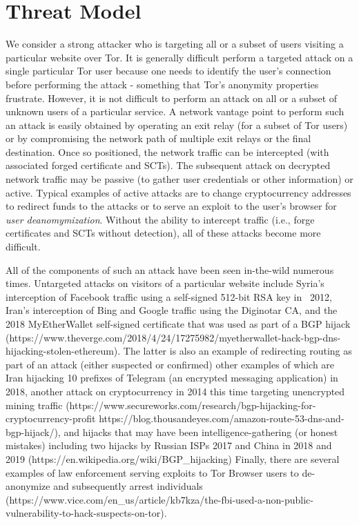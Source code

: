 \section{Threat Model} \label{sec:adversary}

We consider a strong attacker who is targeting all or a subset of users visiting a
particular website over Tor. It is generally difficult perform a targeted attack on a
single particular Tor user because one needs to identify the user's connection
before performing the attack - something that Tor's anonymity properties frustrate.
However, it is not difficult to perform an attack on all or a subset of unknown users
of a particular service. A network vantage point to perform such an attack is easily
obtained by operating an exit relay (for a subset of Tor users) or by compromising
the network path of multiple exit relays or the final destination. Once so
positioned, the network traffic can be intercepted (with associated forged
certificate and SCTs). The subsequent attack on decrypted network traffic may be
passive (to gather user credentials or other information) or active. Typical
examples of active attacks are to change cryptocurrency addresses to redirect
funds to the attacks or to serve an exploit to the user's browser for \emph{user
deanomymization}. Without the ability to intercept traffic (i.e., forge certificates
and SCTs without detection), all of these attacks become more difficult.

All of the components of such an attack have been seen in-the-wild numerous
times. Untargeted attacks on visitors of a particular website include Syria's
interception of Facebook traffic using a self-signed 512-bit RSA key in ~2012,
Iran's interception of Bing and Google traffic using the Diginotar CA, and the 2018
MyEtherWallet self-signed certificate that was used as part of a BGP hijack
(https://www.theverge.com/2018/4/24/17275982/myetherwallet-hack-bgp-dns-hijacking-stolen-ethereum).
The latter is also an example of redirecting routing as
part of an attack (either suspected or confirmed) other examples of which are Iran
hijacking 10 prefixes of Telegram (an encrypted messaging application) in 2018,
another attack on cryptocurrency in 2014 this time targeting unencrypted mining
traffic
(https://www.secureworks.com/research/bgp-hijacking-for-cryptocurrency-profit
https://blog.thousandeyes.com/amazon-route-53-dns-and-bgp-hijack/), and
hijacks that may have been intelligence-gathering (or honest mistakes) including
two hijacks by Russian ISPs 2017 and China in 2018 and 2019
(https://en.wikipedia.org/wiki/BGP_hijacking)
 Finally, there are several examples of law
enforcement serving exploits to Tor Browser users to de-anonymize and
subsequently arrest individuals
(https://www.vice.com/en_us/article/kb7kza/the-fbi-used-a-non-public-vulnerability-to-hack-suspects-on-tor).

